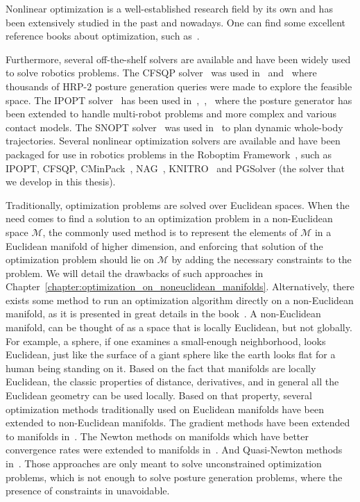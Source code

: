 Nonlinear optimization is a well-established research field by its own and has been extensively studied in the past and nowadays.
One can find some excellent reference books about optimization, such as~\cite{nocedal:book:2006, bonnans:book:2003, boyd2004convex}.

Furthermore, several off-the-shelf solvers are available and have been widely used to solve robotics problems.
The CFSQP solver~\cite{cfsqp:manual} was used in~\cite{escande:iros:2009} and~\cite{escande:ras:2013} where thousands of HRP-2 posture generation queries were made to explore the feasible space.
The IPOPT solver~\cite{wachter:mathprog:2006} has been used in~\cite{vaillant:humanoids:2014},~\cite{vaillant:autonomousrobots:2016},~\cite{bouyarmane:ar:2012} where the posture generator has been extended to handle multi-robot problems and more complex and various contact models.
The SNOPT solver~\cite{gill2005snopt} was used in~\cite{dai2014whole} to plan dynamic whole-body trajectories.
Several nonlinear optimization solvers are available and have been packaged for use in robotics problems in the Roboptim Framework~\cite{moulard:jsme:2013}, such as IPOPT, CFSQP, CMinPack~\cite{cminpack}, NAG~\cite{nag}, KNITRO~\cite{knitro} and PGSolver (the solver that we develop in this thesis).

Traditionally, optimization problems are solved over Euclidean spaces.
When the need comes to find a solution to an optimization problem in a non-Euclidean space $\mathcal{M}$, the commonly used method is to represent the elements of $\mathcal{M}$ in a Euclidean manifold of higher dimension, and enforcing that solution of the optimization problem should lie on $\mathcal{M}$ by adding the necessary constraints to the problem.
We will detail the drawbacks of such approaches in Chapter~\ref{chapter:optimization_on_noneuclidean_manifolds}.
Alternatively, there exists some method to run an optimization algorithm directly on a non-Euclidean manifold, as it is presented in great details in the book~\cite{absil:book:2008}.
A non-Euclidean manifold, can be thought of as a space that is locally Euclidean, but not globally.
For example, a sphere, if one examines a small-enough neighborhood, looks Euclidean, just like the surface of a giant sphere like the earth looks flat for a human being standing on it.
Based on the fact that manifolds are locally Euclidean, the classic properties of distance, derivatives, and in general all the Euclidean geometry can be used locally.
Based on that property, several optimization methods traditionally used on Euclidean manifolds have been extended to non-Euclidean manifolds.
The gradient methods have been extended to manifolds in~\cite{luenberger1972gradient, gabay1982minimizing}.
The Newton methods on manifolds which have better convergence rates were extended to manifolds in~\cite{gabay1982minimizing, stuart1998dynamical, smith2013geometric}.
And Quasi-Newton methods in~\cite{gabay1982minimizing}.
Those approaches are only meant to solve unconstrained optimization problems, which is not enough to solve posture generation problems, where the presence of constraints in unavoidable.

